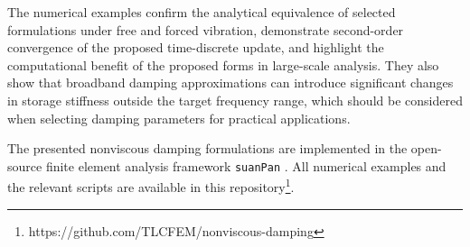 The numerical examples confirm the analytical equivalence of selected formulations under free and forced vibration, demonstrate second-order convergence of the proposed time-discrete update, and highlight the computational benefit of the proposed forms in large-scale analysis. They also show that broadband damping approximations can introduce significant changes in storage stiffness outside the target frequency range, which should be considered when selecting damping parameters for practical applications.

The presented nonviscous damping formulations are implemented in the open-source finite element analysis framework \texttt{suanPan} \citep{Chang2026}. All numerical examples and the relevant scripts are available in this repository\footnote{https://github.com/TLCFEM/nonviscous-damping}.
